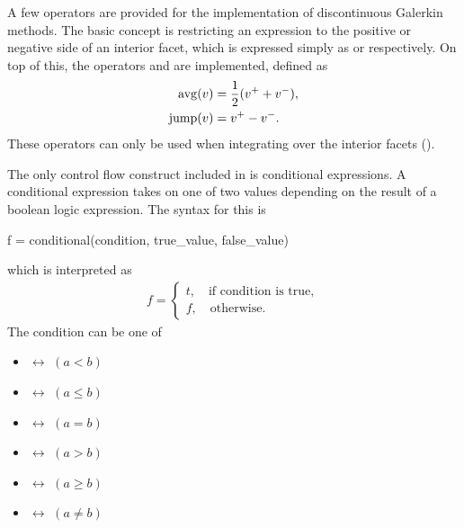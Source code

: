 A few operators are provided for the implementation of discontinuous
Galerkin methods.  The basic concept is restricting an expression to
the positive or negative side of an interior facet, which is expressed
simply as  or  respectively. On top of
this, the operators  and  are implemented,
defined as
\begin{align}
\operatorname{avg}(v)  &= \frac 1 2 (v^+ + v^-), \\
\operatorname{jump}(v) &= v^+ - v^- .
\end{align}
These operators can only be used when integrating over the interior facets
().

The only control flow construct included in \ufl{} is conditional
expressions. A conditional expression takes on one of two values depending
on the result of a boolean logic expression. The syntax for this is
\begin{uflcode}
f = conditional(condition, true_value, false_value)
\end{uflcode}
which is interpreted as
\begin{align}
f = \begin{cases}
    t, \quad \mbox{if condition is true}, \\
    f, \quad \mbox{otherwise}.
    \end{cases}
\end{align}
The condition can be one of
\begin{multicols}{2}
\begin{itemize}
\item {} $\leftrightarrow$ $(a < b)$
\item {} $\leftrightarrow$ $(a \le b)$
\item {} $\leftrightarrow$ $(a = b)$
\end{itemize}
\begin{itemize}
\item {} $\leftrightarrow$ $(a > b)$
\item {} $\leftrightarrow$ $(a \ge b)$
\item {} $\leftrightarrow$ $(a \ne b)$
\end{itemize}
\end{multicols}

